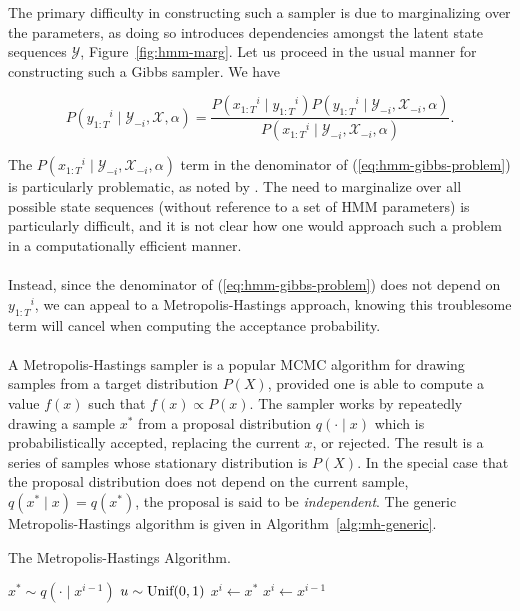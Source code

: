 \documentclass[12pt]{report}
\newcommand{\1}[0]{\mathbbm{1}}
\newcommand{\Unif}[0]{\textnormal{Unif}}
\newcommand{\seq}[3]{\ensuremath{#1_{{#2}:{#3}}}}
\begin{document}
The primary difficulty in constructing such a sampler is due to marginalizing over the parameters,
as doing so introduces dependencies amongst the latent state sequences $\mathcal{Y}$, Figure~\ref{fig:hmm-marg}.
Let us proceed in the usual manner for constructing such a Gibbs sampler. We have

\begin{equation}
    P(\seq{y}{1}{T}^i \mid \mathcal{Y}_{-i}, \mathcal{X}, \alpha)
    = \frac{P(\seq{x}{1}{T}^i \mid \seq{y}{1}{T}^i)P(\seq{y}{1}{T}^i \mid \mathcal{Y}_{-i}, \mathcal{X}_{-i}, \alpha)}
      {P(\seq{x}{1}{T}^i \mid \mathcal{Y}_{-i}, \mathcal{X}_{-i}, \alpha)}. \label{eq:hmm-gibbs-problem}
\end{equation}

The $P(\seq{x}{1}{T}^i \mid \mathcal{Y}_{-i}, \mathcal{X}_{-i}, \alpha)$ term in the denominator
of (\ref{eq:hmm-gibbs-problem}) is particularly problematic, as noted by \cite{pcfg-bayesian-johnson}.
The need to marginalize over all possible state sequences (without reference to a set of \ac{HMM} parameters)
is particularly difficult, and it is not clear how one would approach such a problem
in a computationally efficient manner.
\\\\
Instead, since the denominator of (\ref{eq:hmm-gibbs-problem}) does not depend on $\seq{y}{1}{T}^i$,
we can appeal to a Metropolis-Hastings approach, knowing this troublesome term will cancel when
computing the acceptance probability.
\\\\
A Metropolis-Hastings sampler \cite{mcmc-ml} is a popular \ac{MCMC} algorithm for drawing samples
from a target distribution $P(X)$, provided one is able to compute a value
$f(x)$ such that $f(x) \propto P(x)$. The sampler works by repeatedly drawing a
sample $x^*$ from a proposal distribution $q(\cdot \mid x)$ which is probabilistically
accepted, replacing the current $x$, or rejected. The result is a series of samples
whose stationary distribution is $P(X)$. In the special case that the proposal distribution
does not depend on the current sample, $q(x^* \mid x) = q(x^*)$, the proposal is said to
be \emph{independent}. The generic Metropolis-Hastings algorithm is given in Algorithm~\ref{alg:mh-generic}.

\begin{algorithm}[H]
    \caption{The Metropolis-Hastings Algorithm.\label{alg:mh-generic}}
    \begin{algorithmic}[1]
            \State $x^* \sim q(\cdot \mid x^{i-1})$
            \State $u \sim \Unif(0, 1)$
                \State $x^i \gets x^*$
            \Else
                \State $x^i \gets x^{i-1}$
            \EndIf
        \EndFor
        \State {}
    \end{algorithmic}
\end{algorithm}
\end{document}
